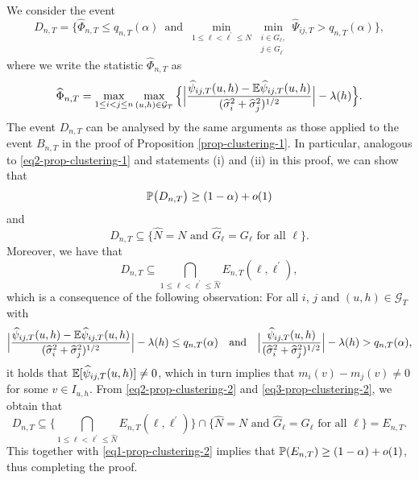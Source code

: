 \documentclass[a4paper,12pt]{article}
\begin{document}
We consider the event
\[ D_{n,T} = \Big\{ \widehat{\Phi}_{n,T} \le q_{n,T}(\alpha) \, \text{ and } \,  \min_{1 \le \ell < \ell^\prime \le N} \min_{\substack{i \in G_\ell, \\ j \in G_{\ell^\prime}}} \widehat{\Psi}_{ij,T} > q_{n,T}(\alpha) \Big\}, \]
where we write the statistic $\widehat{\Phi}_{n,T}$ as
\[ \widehat{\Phi}_{n,T} = \max_{1 \le i < j \le n} \max_{(u,h) \in \mathcal{G}_T} \Big\{ \Big| \frac{\widehat{\psi}_{ij,T}(u,h)- \mathbb{E} \widehat{\psi}_{ij,T}(u,h)} {(\widehat{\sigma}_i^2 + \widehat{\sigma}_j^2)^{1/2}} \Big| - \lambda(h) \Big \}. \]
The event $D_{n,T}$ can be analysed by the same arguments as those applied to the event $B_{n,T}$ in the proof of Proposition \ref{prop-clustering-1}. In particular, analogous to \eqref{eq2-prop-clustering-1} and statements (i) and (ii) in this proof, we can show that
\begin{equation}\label{eq1-prop-clustering-2}
\mathbb{P} \big( D_{n,T} \big) \ge (1-\alpha) + o(1)
\end{equation}
and 
\begin{equation}\label{eq2-prop-clustering-2}
D_{n,T} \subseteq \big\{ \widehat{N} = N \text{ and } \widehat{G}_\ell = G_\ell \text{ for all } \ell \big\}.
\end{equation}
Moreover, we have that
\begin{equation}\label{eq3-prop-clustering-2}
D_{n,T} \subseteq \bigcap_{1 \le \ell < \ell^\prime \le \widehat{N}} E_{n,T}(\ell,\ell^\prime),
\end{equation}
which is a consequence of the following observation: For all $i$, $j$ and $(u,h) \in \mathcal{G}_T$ with 
\[ \Big|\frac{\widehat{\psi}_{ij,T}(u,h) - \mathbb{E} \widehat{\psi}_{ij,T}(u,h)}{(\widehat{\sigma}_i^2 + \widehat{\sigma}_j^2)^{1/2}}\Big| - \lambda(h) \le q_{n,T}(\alpha) \quad \text{and} \quad \Big|\frac{\widehat{\psi}_{ij,T}(u,h)}{(\widehat{\sigma}_i^2 + \widehat{\sigma}_j^2)^{1/2}}\Big| - \lambda(h) > q_{n,T}(\alpha), \]
it holds that $\mathbb{E}[\widehat{\psi}_{ij,T}(u,h)] \ne 0$, which in turn implies that $m_i(v) - m_j(v) \ne 0$ for some $v \in I_{u,h}$. From \eqref{eq2-prop-clustering-2} and \eqref{eq3-prop-clustering-2}, we obtain that 
\[ D_{n,T} \subseteq \Big\{ \bigcap_{1 \le \ell < \ell^\prime \le \widehat{N}} E_{n,T}(\ell,\ell^\prime) \Big\} \cap \big\{ \widehat{N} = N \text{ and } \widehat{G}_\ell = G_\ell \text{ for all } \ell \big\} = E_{n,T}. \] 
This together with \eqref{eq1-prop-clustering-2} implies that $\mathbb{P}(E_{n,T}) \ge (1-\alpha) + o(1)$, thus completing the proof. 
\end{document}
